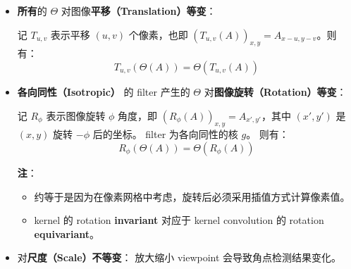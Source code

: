 \begin{itemize}
\item
  \textbf{所有}的 \(\Theta\) 对图像\textbf{平移（Translation）等变}：

  记 \(T_{u, v}\) 表示平移 \((u, v)\) 个像素，也即
  \((T_{u,v}(A))_{x, y} = A_{x-u, y-v}\)。则有： \[
  T_{u, v}(\Theta(A)) = \Theta(T_{u, v}(A))
  \]
\item
  \textbf{各向同性（Isotropic）} 的 filter 产生的 \(\Theta\)
  对\textbf{图像旋转（Rotation）等变}：

  记 \(R_\phi\) 表示图像旋转 \(\phi\) 角度，即
  \((R_\phi(A))_{x,y} = A_{x',y'}\)，其中 \((x', y')\) 是 \((x,y)\) 旋转
  \(-\phi\) 后的坐标。 filter 为各向同性的核 \(g\)。 则有： \[
  R_\phi(\Theta(A)) = \Theta(R_\phi(A))
  \]

  \textbf{注}：

  \begin{itemize}
  \tightlist
  \item
    约等于是因为在像素网格中考虑，旋转后必须采用插值方式计算像素值。
  \item
    kernel 的 rotation \textbf{invariant} 对应于 kernel convolution 的
    rotation \textbf{equivariant}。
  \end{itemize}
\item
  对\textbf{尺度（Scale）不等变}： 放大缩小 viewpoint
  会导致角点检测结果变化。
\end{itemize}
